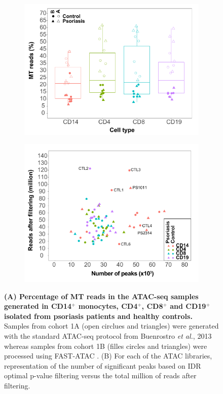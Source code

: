 \begin{figure}[htbp]
\centering
\begin{subfigure}{0.45\textwidth}
\centering
\includegraphics[width=\textwidth]{./Appendix/pdfs/Chapter4/ATAC_PS_CTL_MT_percent_boxplot}
\caption{\textbf{}}
\end{subfigure}
\begin{subfigure}{0.5\textwidth}
\centering
\includegraphics[width=\textwidth]{./Appendix/pdfs/Chapter4/ATAC_PS_CTL_reads_vs_peaks_dotplot}
\caption{\textbf{}}
\end{subfigure}
\caption[Percentage of MT reads and called peaks after IDR p-value filtering in the ATAClibraries generated in CD14$^+$ monocytes, CD4$^+$, CD8$^+$ and CD19$^+$ isolated from psoriasis patients and healthy controls.]{\textbf{(A) Percentage of MT reads in the ATAC-seq samples generated in CD14$^+$ monocytes, CD4$^+$, CD8$^+$ and CD19$^+$ isolated from psoriasis patients and healthy controls.} Samples from cohort 1A (open circlues and triangles) were generated with the standard ATAC-seq protocol from Buenrostro \textit{et al.}, 2013 whereas samples from cohort 1B (filles circles and triangles) were processed using FAST-ATAC \parencite{Corces2016}. (B) For each of the ATAC libraries, representation of the number of significant peaks based on IDR optimal p-value filtering versus the total million of reads after filtering.}

\end{figure}

